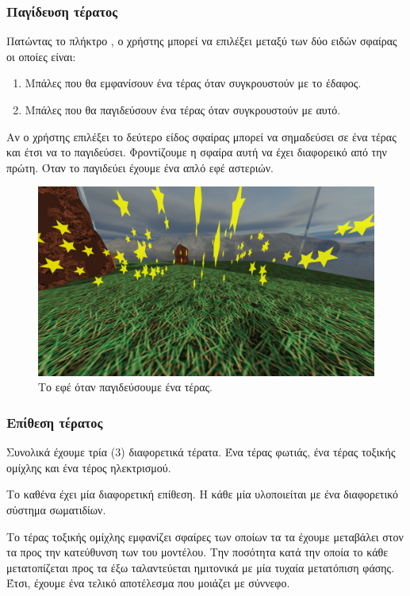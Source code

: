 \documentclass[11pt]{scrartcl} %
\newenvironment{centerimg}[1]%
{%
    \begin{figure}[H]
        #1
    \begin{center}
}%
{%
    \end{center}
    \end{figure}
}
\begin{document}
\subsubsection{Παγίδευση τέρατος}

Πατώντας το πλήκτρο , ο χρήστης μπορεί να επιλέξει μεταξύ των δύο ειδών 
σφαίρας οι οποίες είναι:
\begin{enumerate}
    \item Μπάλες που θα εμφανίσουν ένα τέρας όταν συγκρουστούν με το έδαφος.
    \item Μπάλες που θα παγιδεύσουν ένα τέρας όταν συγκρουστούν με αυτό.
\end{enumerate}

Αν ο χρήστης επιλέξει το δεύτερο είδος σφαίρας μπορεί να σημαδεύσει σε ένα τέρας και 
έτσι να το παγιδεύσει. Φροντίζουμε η σφαίρα αυτή να έχει διαφορεικό  από την πρώτη. 
Όταν το παγιδεύει έχουμε ένα απλό εφέ αστεριών. 

\begin{centerimg}{\caption{Το εφέ όταν παγιδεύσουμε ένα τέρας.}}
    \includegraphics[width=.7\textwidth]{./assets/stars.png}
\end{centerimg}


\subsubsection{Επίθεση τέρατος}

Συνολικά έχουμε τρία (3) διαφορετικά τέρατα. Ένα τέρας φωτιάς, ένα τέρας τοξικής ομίχλης και ένα τέρος ηλεκτρισμού.

Το καθένα έχει μία διαφορετική επίθεση. Η κάθε μία υλοποιείται με ένα 
διαφορετικό σύστημα σωματιδίων. 

Το τέρας τοξικής ομίχλης εμφανίζει σφαίρες των οποίων τα  
τα έχουμε μεταβάλει στον   τα 
προς την κατεύθυνση των  του μοντέλου. 
Την ποσότητα κατά την οποία το κάθε  μετατοπίζεται προς 
τα έξω ταλαντεύεται ημιτονικά με μία τυχαία μετατόπιση φάσης. 
Έτσι, έχουμε ένα τελικό αποτέλεσμα που μοιάζει με σύννεφο. 
\end{document}
